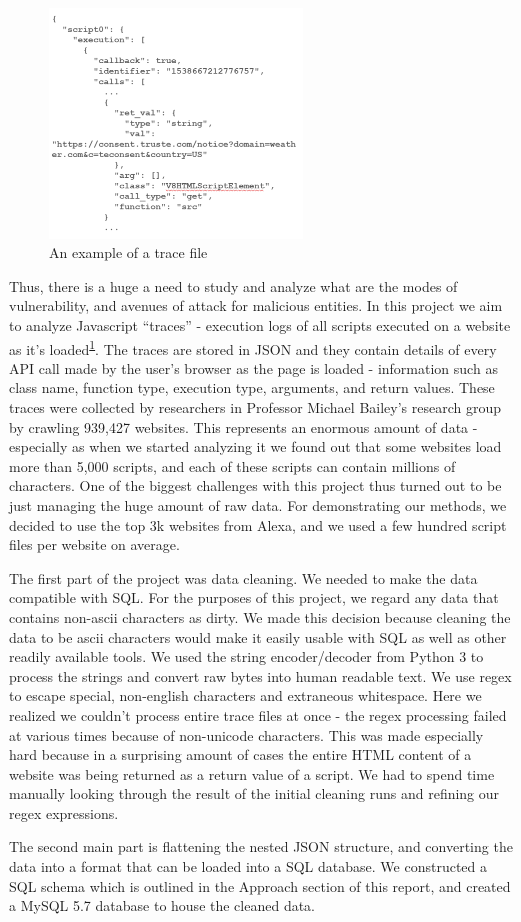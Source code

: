 \begin{figure}
\centering
\includegraphics[width=0.6\textwidth]{images/trace.png}
\caption{\label{fig:trace1} An example of a trace file}
\end{figure}

Thus, there is a huge a need to study and analyze what are the modes of vulnerability, and avenues of attack for malicious entities. In this project we aim to analyze Javascript ``traces'' - execution logs of all scripts executed on a website as it's loaded\textsuperscript{\ref{fig:trace1}}. The traces are stored in JSON and they contain details of every API call made by the user's browser as the page is loaded - information such as class name, function type, execution type, arguments, and return values. These traces were collected by researchers in Professor Michael Bailey's research group by crawling 939,427 websites. This represents an enormous amount of data - especially as when we started analyzing it we found out that some websites load more than 5,000 scripts, and each of these scripts can contain millions of characters. One of the biggest challenges with this project thus turned out to be just managing the huge amount of raw data. For demonstrating our methods, we decided to use the top 3k websites from Alexa, and we used a few hundred script files per website on average.

The first part of the project was data cleaning. We needed to make the data compatible with SQL. For the purposes of this project, we regard any data that contains non-ascii characters as dirty. We made this decision because cleaning the data to be ascii characters would make it easily usable with SQL as well as other readily available tools. We used the string encoder/decoder from Python 3 to process the strings and convert raw bytes into human readable text. We use regex to escape special, non-english characters and extraneous whitespace. Here we realized we couldn't process entire trace files at once - the regex processing failed at various times because of non-unicode characters. This was made especially hard because in a surprising amount of cases the entire HTML content of a website was being returned as a return value of a script. We had to spend time manually looking through the result of the initial cleaning runs and refining our regex expressions.

The second main part is flattening the nested JSON structure, and converting the data into a format that can be loaded into a SQL database. We constructed a SQL schema which is outlined in the Approach section of this report, and created a MySQL 5.7 database to house the cleaned data.
